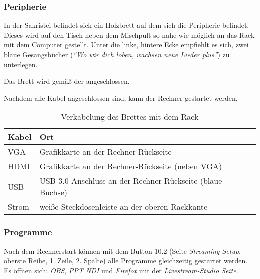 			\subsubsection*{Peripherie}
				In der Sakristei befindet sich ein Holzbrett auf dem sich die Peripherie befindet.
				Dieses wird auf den Tisch neben dem Mischpult so nahe wie möglich an das Rack mit dem Computer gestellt.
				Unter die linke, hintere Ecke empfiehlt es sich, zwei blaue Gesangsbücher (\textit{"`Wo wir dich loben, wachsen neue Lieder plus"'}) zu unterlegen.

				Das Brett wird gemäß der  angeschlossen.

				Nachdem alle Kabel angeschlossen sind, kann der Rechner gestartet werden.

				\begin{table}[h]
					\caption{Verkabelung des Brettes mit dem Rack}
					\label{table:grundlagen:video:aufbau:peripherie}
					\centering

					\begin{tabular}{ll}
						\toprule
						\textbf{Kabel} & \textbf{Ort} \\
						\midrule
						VGA & Grafikkarte an der Rechner-Rückseite \\
						HDMI & Grafikkarte an der Rechner-Rückseite (neben VGA) \\
						USB & USB 3.0 Anschluss an der Rechner-Rückseite (blaue Buchse) \\
						Strom & weiße Steckdosenleiste an der oberen Rackkante \\
						\bottomrule
					\end{tabular}
				\end{table}
			\subsubsection*{Programme}
				Nach dem Rechnerstart können mit dem Button 10.2 (Seite \textit{Streaming Setup}, oberste Reihe, 1. Zeile, 2. Spalte) alle Programme gleichzeitig gestartet werden.
				Es öffnen sich: \textit{OBS}, \textit{PPT NDI} und \textit{Firefox} mit der \textit{Livestream-Studio Seite}.